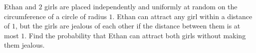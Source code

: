 Ethan and $2$ girls are placed independently and uniformly at random on the circumference of a circle of radius $1$. Ethan can attract any girl within a distance of $1$, but the girls are jealous of each other if the distance between them is at most $1$. Find the probability that Ethan can attract both girls without making them jealous.
